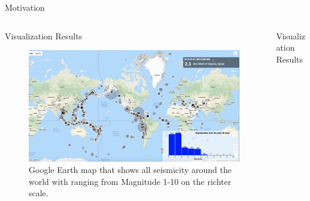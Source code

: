 \documentclass[final]{beamer}
\newlength{\onecolwid}
\newlength{\twocolwid}
\begin{document}
\begin{frame}[t]
\begin{columns}[t]
\begin{column}{\twocolwid}
\begin{alertblock}{Motivation}
\end{alertblock} 


\begin{columns}[t,totalwidth=\twocolwid] %

\begin{column}{\onecolwid} %


\begin{block}{Visualization Results}

\begin{figure}
\includegraphics[width=0.8\linewidth]{Earthquake_Catalog.png}
\caption{Google Earth map that shows all seismicity around the world with ranging from Magnitude 1-10 on the richter scale. }
\end{figure}



\end{block}


\end{column} %

\begin{column}{\onecolwid} %


\begin{block}{Visualization Results}


\end{block}
\end{column}
\end{columns}
\end{column}
\end{columns}
\end{frame}
\end{document}
